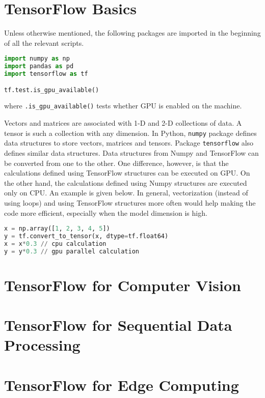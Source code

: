 \section{TensorFlow Basics}

Unless otherwise mentioned, the following packages are imported in the beginning of all the relevant scripts.
\begin{lstlisting}[language=Python]
import numpy as np
import pandas as pd
import tensorflow as tf

tf.test.is_gpu_available()
\end{lstlisting}
where \verb|.is_gpu_available()| tests whether GPU is enabled on the machine.

Vectors and matrices are associated with 1-D and 2-D collections of data. A tensor is such a collection with any dimension. In Python, \verb|numpy| package defines data structures to store vectors, matrices and tensors. Package \verb|tensorflow| also defines similar data structures. Data structures from Numpy and TensorFlow can be converted from one to the other. One difference, however, is that the calculations defined using TensorFlow structures can be executed on GPU. On the other hand, the calculations defined using Numpy structures are executed only on CPU. An example is given below. In general, vectorization (instead of using loops) and using TensorFlow structures more often would help making the code more efficient, especially when the model dimension is high.
\begin{lstlisting}[language=Python]
x = np.array([1, 2, 3, 4, 5])
y = tf.convert_to_tensor(x, dtype=tf.float64)
x = x*0.3 // cpu calculation
y = y*0.3 // gpu parallel calculation
\end{lstlisting}




\section{TensorFlow for Computer Vision}





\section{TensorFlow for Sequential Data Processing}

\section{TensorFlow for Edge Computing}

